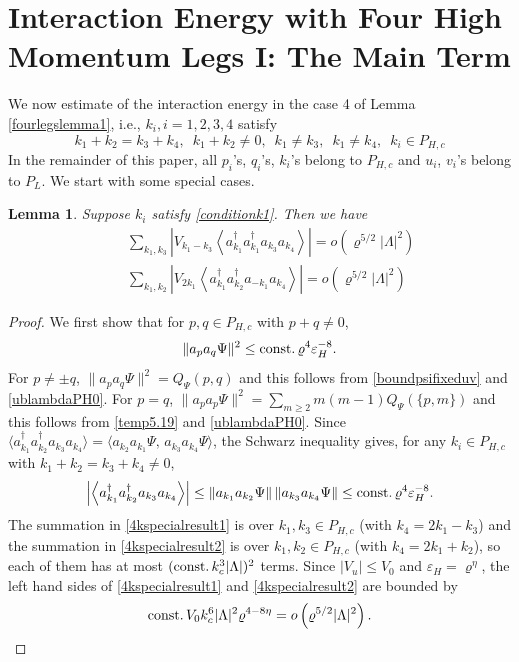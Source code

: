 \documentclass[11pt]{article}
\numberwithin{equation}{section}
\newcommand{\beq}{\begin{equation}}
\newcommand{\eeq}{\end{equation}}
\newcommand{\beqa}{\begin{eqnarray}}
\newcommand{\eeqa}{\end{eqnarray}}
\newcommand\eps{\varepsilon}
\newcommand\const{{\rm const.\, }}
\renewcommand\rho\varrho
\newtheorem{lem}{Lemma}[section]
\theoremstyle{definition}
\begin{document}
\section{Interaction  Energy with Four High Momentum Legs I: The Main Term} 


We now  estimate of the interaction energy in the  case 4  of Lemma \ref{fourlegslemma1}, i.e., 
$k_i, i=1, 2, 3, 4 $ satisfy  
\beq\label{conditionk1}
k_1+k_2=k_3+k_4,\,\,\, k_1+k_2\neq 0,\,\,\,k_1\neq k_3,\,\,\,k_1\neq k_4, \,\,\,k_i\in P_{H,c}
\eeq
 In the remainder of this paper,  all $p_i$'s, $q_i$'s, $k_i$'s belong to $P_{H,c}$ and $u_i$, $v_i$'s belong to $P_L$.  We start with some special cases.

\begin{lem} Suppose  $k_i$ satisfy  \eqref{conditionk1}. Then  we have
\beqa\label{4kspecialresult1}
&&\sum_{k_1,k_3}\left|  V_{k_{1}-k_{3}}\left\langle a^\dagger_{k_1}a^\dagger_{k_1}a_{k_3}a_{k_4}\right\rangle\right|=o\left(\rho^{5/2}|\Lambda|^2\right)\\\label{4kspecialresult2}
&&\sum_{k_1,k_2}\left|V_{2k_{1}} \left\langle a^\dagger_{k_1}a^\dagger_{k_2}a_{-k_1}a_{k_4}\right\rangle\right|=o\left(\rho^{5/2}|\Lambda|^2\right)
\eeqa
\end{lem}

\begin{proof} We first show that for $p,q\in P_{H,c}$ with $p+q\neq 0$, 
\beq
\|a_pa_q\Psi\|^2\leq \const\rho^4\eps_H^{-8}.
\eeq
For $p\neq \pm q$, $\|a_pa_q\Psi\|^2=Q_\Psi(p,q)$ and this follows from \eqref{boundpsifixeduv} and \eqref{ublambdaPH0}. For $p=q$, $\|a_pa_p\Psi\|^2=\sum_{m\geq 2}m(m-1)Q_\Psi(\{p,m\})$ and this follows from \eqref{temp5.19} and \eqref{ublambdaPH0}. 
Since $\langle a^\dagger_{k_1}a^\dagger_{k_2}a_{k_3}a_{k_4}\rangle=\langle a_{k_2}a_{k_1}\Psi,\, a_{k_3}a_{k_4}\Psi\rangle$, the Schwarz inequality gives, for any $k_i\in P_{H,c}$ with $k_1+k_2=k_3+k_4\neq 0$,
\beq
\left|\left\langle a^\dagger_{k_1}a^\dagger_{k_2}a_{k_3}a_{k_4}\right\rangle\right|\leq \|a_{k_1}a_{k_2}\Psi\|\,\|a_{k_3}a_{k_4}\Psi\|\leq \const\rho^4\eps_H^{-8}.
\eeq
The summation in \eqref{4kspecialresult1} is over $k_1,k_3\in P_{H,c}$ (with $k_4=2k_1-k_3$) and the summation in \eqref{4kspecialresult2} is over $k_1,k_2\in P_{H,c}$ (with $k_4=2k_1+k_2$), so each of them has at most $(\const k_c^3|\Lambda|)^2$ terms. Since $|V_u|\leq V_0$ and $\eps_H=\rho^\eta$, the left hand sides of \eqref{4kspecialresult1} and \eqref{4kspecialresult2} are bounded by
\beq
\const V_0 k_c^6|\Lambda|^2\rho^{4-8\eta}=o\left(\rho^{5/2}|\Lambda|^2\right). 
\eeq
 \end{proof}
 
\end{document}
